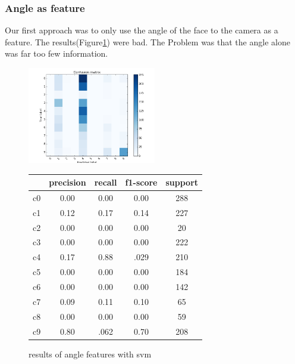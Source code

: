 \documentclass[10pt,twocolumn,letterpaper]{article}
\begin{document}
	\subsubsection{Angle as feature}
	Our first approach was to only use the angle of the face to the camera as a feature. The results(Figure\ref{headpose_feature}) were bad. The Problem was that the angle alone was far too few information.
	\begin{figure}[h]
	\centering
	\includegraphics[width=0.5\textwidth]{angle_only}\hspace{0.01\textwidth}
	\begin{tabular}{c||c|c|c|c}
	  & precision&recall&f1-score&support\\	\hline
	 c0&0.00&0.00&0.00&288\\
	 c1&0.12&0.17&0.14&227\\
	 c2&0.00&0.00&0.00&20\\
	 c3&0.00&0.00&0.00&222\\
	 c4&0.17&0.88&.029&210\\
	 c5&0.00&0.00&0.00&184\\
	 c6&0.00&0.00&0.00&142\\
	 c7&0.09&0.11&0.10&65\\
	 c8&0.00&0.00&0.00&59\\
	 c9&0.80&.062&0.70&208
	\end{tabular}
	\caption{results of angle features with svm}
	\label{headpose_feature}
	\end{figure}
\end{document}
